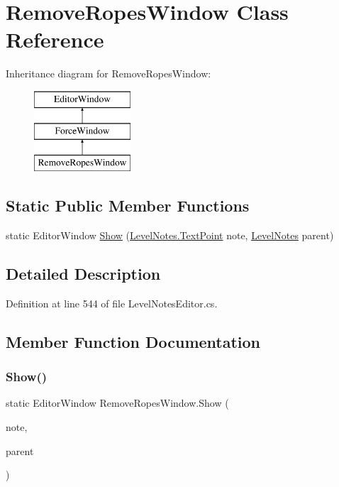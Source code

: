 \hypertarget{class_remove_ropes_window}{}\section{Remove\+Ropes\+Window Class Reference}
\label{class_remove_ropes_window}
Inheritance diagram for Remove\+Ropes\+Window\+:\begin{figure}[H]
\begin{center}
\leavevmode
\includegraphics[height=3.000000cm]{class_remove_ropes_window}
\end{center}
\end{figure}
\subsection*{Static Public Member Functions}
\begin{DoxyCompactItemize}
\item 
static Editor\+Window \mbox{\hyperlink{class_remove_ropes_window_aa42834c0fad1f59bb195065f75a4bb88}{Show}} (\mbox{\hyperlink{class_level_notes_1_1_text_point}{Level\+Notes.\+Text\+Point}} note, \mbox{\hyperlink{class_level_notes}{Level\+Notes}} parent)
\end{DoxyCompactItemize}


\subsection{Detailed Description}


Definition at line 544 of file Level\+Notes\+Editor.\+cs.



\subsection{Member Function Documentation}
\mbox{\label{class_remove_ropes_window_aa42834c0fad1f59bb195065f75a4bb88}} 
\subsubsection{\texorpdfstring{Show()}{Show()}}
{\footnotesize\ttfamily static Editor\+Window Remove\+Ropes\+Window.\+Show (\begin{DoxyParamCaption}\item[{\mbox{\hyperlink{class_level_notes_1_1_text_point}{Level\+Notes.\+Text\+Point}}}]{note,  }\item[{\mbox{\hyperlink{class_level_notes}{Level\+Notes}}}]{parent }\end{DoxyParamCaption})\hspace{0.3cm}{\ttfamily [static]}}



